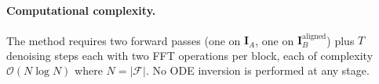 \paragraph{Computational complexity.}
The method requires two forward passes (one on $\mathbf{I}_A$, one on
$\mathbf{I}_B^{\text{aligned}}$) plus $T$ denoising steps each with two FFT operations per
block, each of complexity $\mathcal{O}(N \log N)$ where $N = |\mathcal{F}|$.
No ODE inversion is performed at any stage.
